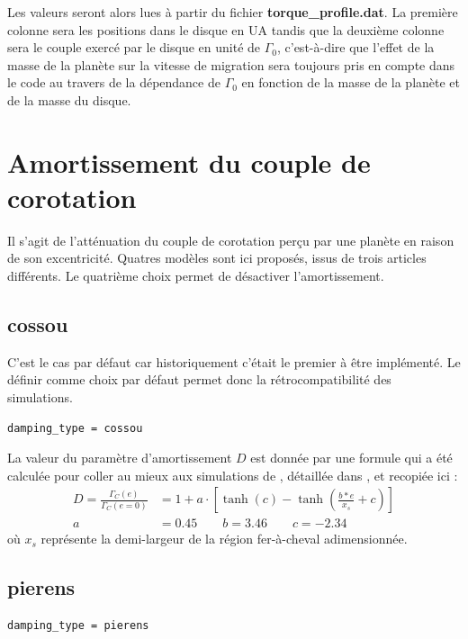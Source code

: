 Les valeurs seront alors lues à partir du fichier \textbf{torque\_profile.dat}. La première colonne sera les positions dans le
disque en \unit{UA} tandis que la deuxième colonne sera le couple exercé par le disque en unité de $\Gamma_0$, c'est-à-dire que
l'effet de la masse de la planète sur la vitesse de migration sera toujours pris en compte dans le code au travers de la
dépendance de $\Gamma_0$ en fonction de la masse de la planète et de la masse du disque.

\section{Amortissement du couple de corotation}
Il s'agit de l'atténuation du couple de corotation perçu par une planète en raison de son excentricité. Quatres modèles sont
ici proposés, issus de trois articles différents. Le quatrième choix permet de désactiver l'amortissement.

\subsection{cossou}
C'est le cas par défaut car historiquement c'était le premier à être implémenté. Le définir comme choix par défaut permet donc
la rétrocompatibilité des simulations. 

\begin{verbatim}
damping_type = cossou
\end{verbatim}

La valeur du paramètre d'amortissement $D$ est donnée par une formule qui a été calculée pour coller au mieux aux simulations de
\cite{bitsch2010orbital}, détaillée dans \citep[eq (1)]{cossou2013convergence}, et recopiée ici : 
\begin{subequations}
\begin{align}
D = \frac{\Gamma_C(e)}{\Gamma_C (e=0)} &= 1 + a \cdot \left[\tanh(c) - \tanh\left(\frac{b *
e}{x_s}+c\right)\right]\\
a &= 0.45 \qquad b=3.46 \qquad c= -2.34
\end{align}
\end{subequations}
où $x_s$ représente la demi-largeur de la région fer-à-cheval adimensionnée.

\subsection{pierens}
\begin{verbatim}
damping_type = pierens
\end{verbatim}

